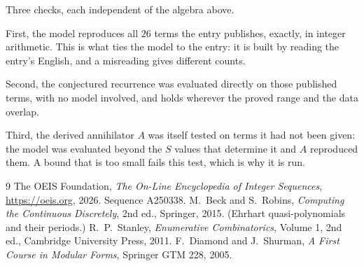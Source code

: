 \documentclass[11pt,a4paper]{article}
\theoremstyle{plain}
\theoremstyle{definition}
\begin{document}
Three checks, each independent of the algebra above.

First, the model reproduces all $26$ terms the entry publishes, exactly, in integer
arithmetic. This is what ties the model to the entry: it is built by reading the entry's
English, and a misreading gives different counts.

Second, the conjectured recurrence was evaluated directly on those published terms, with no
model involved, and holds wherever the proved range and the data overlap.

Third, the derived annihilator $A$ was itself tested on terms it had not been given: the model
was evaluated beyond the $S$ values that determine it and $A$ reproduced them. A bound that is
too small fails this test, which is why it is run.

\begin{thebibliography}{9}
 The OEIS Foundation, \emph{The On-Line Encyclopedia of Integer
Sequences}, \url{https://oeis.org}, 2026. Sequence A250338.
 M.~Beck and S.~Robins, \emph{Computing the Continuous Discretely},
2nd ed., Springer, 2015. (Ehrhart quasi-polynomials and their periods.)
 R.~P.~Stanley, \emph{Enumerative Combinatorics}, Volume 1, 2nd ed.,
Cambridge University Press, 2011.
 F.~Diamond and J.~Shurman, \emph{A First Course in Modular Forms},
Springer GTM 228, 2005.
\end{thebibliography}
\end{document}
